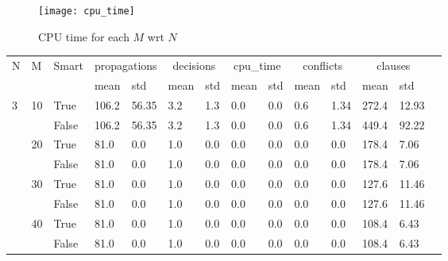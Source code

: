 \begin{figure}
  \centering
  \texttt{[image: cpu\_time]}
  \label{fig_cpu_time}
  \caption{CPU time for each $M$ wrt $N$}
\end{figure}

\begin{landscape}
\begin{small}
\begin{longtable}[c]{@{}lll|ll|ll|ll|ll|lll@{}}
\toprule
N  & M  & Smart & \multicolumn{2}{c}{propagations} & \multicolumn{2}{c}{decisions} & \multicolumn{2}{c}{cpu\_time} & \multicolumn{2}{c}{conflicts} & \multicolumn{2}{c}{clauses} &  \\* 
   &    &       & mean            & std            & mean          & std           & mean          & std           & mean          & std           & mean          & std         &  \\
  \midrule
\endfirsthead
%
\endhead
%
\bottomrule
\endfoot
%
\endlastfoot
%
3  & 10 & True  & 106.2           & 56.35          & 3.2           & 1.3           & 0.0           & 0.0           & 0.6           & 1.34          & 272.4         & 12.93       &  \\
   &    & False & 106.2           & 56.35          & 3.2           & 1.3           & 0.0           & 0.0           & 0.6           & 1.34          & 449.4         & 92.22       &  \\
   & 20 & True  & 81.0            & 0.0            & 1.0           & 0.0           & 0.0           & 0.0           & 0.0           & 0.0           & 178.4         & 7.06        &  \\
   &    & False & 81.0            & 0.0            & 1.0           & 0.0           & 0.0           & 0.0           & 0.0           & 0.0           & 178.4         & 7.06        &  \\
   & 30 & True  & 81.0            & 0.0            & 1.0           & 0.0           & 0.0           & 0.0           & 0.0           & 0.0           & 127.6         & 11.46       &  \\
   &    & False & 81.0            & 0.0            & 1.0           & 0.0           & 0.0           & 0.0           & 0.0           & 0.0           & 127.6         & 11.46       &  \\
   & 40 & True  & 81.0            & 0.0            & 1.0           & 0.0           & 0.0           & 0.0           & 0.0           & 0.0           & 108.4         & 6.43        &  \\
   &    & False & 81.0            & 0.0            & 1.0           & 0.0           & 0.0           & 0.0           & 0.0           & 0.0           & 108.4         & 6.43        &  \\

\end{longtable}
\end{small}
\end{landscape}
